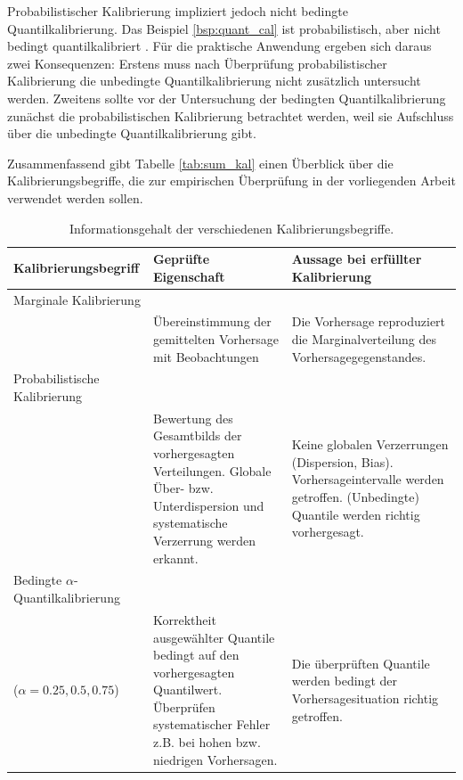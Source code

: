 Probabilistischer Kalibrierung impliziert jedoch nicht bedingte Quantilkalibrierung. Das Beispiel \ref{bsp:quant_cal} ist probabilistisch, aber nicht bedingt quantilkalibriert \parencite[Example 2.10]{gneiting2023regression}. Für die praktische Anwendung ergeben sich daraus zwei Konsequenzen: Erstens muss nach Überprüfung probabilistischer Kalibrierung die unbedingte Quantilkalibrierung nicht zusätzlich untersucht werden. Zweitens sollte vor der Untersuchung der bedingten Quantilkalibrierung zunächst die probabilistischen Kalibrierung betrachtet werden, weil sie Aufschluss über die unbedingte Quantilkalibrierung gibt.

Zusammenfassend gibt Tabelle \ref{tab:sum_kal} einen Überblick über die Kalibrierungsbegriffe, die zur empirischen Überprüfung in der vorliegenden Arbeit verwendet werden sollen.

\begin{table}[ht]
\caption{Informationsgehalt der verschiedenen Kalibrierungsbegriffe.}
\fontsize{10}{12}\selectfont
\label{tab:sum_kal}
\centering
\begin{tabularx}{\textwidth}{lXX}
\toprule
Kalibrierungsbegriff & Geprüfte Eigenschaft & Aussage bei erfüllter Kalibrierung \\
\midrule
Marginale Kalibrierung \\ &
Übereinstimmung der gemittelten Vorhersage mit Beobachtungen &
Die Vorhersage reproduziert die Marginalverteilung des Vorhersagegegenstandes.\\
\addlinespace
Probabilistische Kalibrierung \\ &
Bewertung des Gesamtbilds der vorhergesagten Verteilungen. Globale Über- bzw. Unterdispersion und systematische Verzerrung werden erkannt. &
Keine globalen Verzerrungen (Dispersion, Bias). Vorhersageintervalle werden getroffen. (Unbedingte) Quantile werden richtig vorhergesagt.\\
\addlinespace
Bedingte $\alpha$-Quantilkalibrierung\\ ($\alpha=0.25,0.5,0.75$) & Korrektheit ausgewählter Quantile bedingt auf den vorhergesagten Quantilwert. Überprüfen systematischer Fehler z.B. bei hohen bzw. niedrigen Vorhersagen. &
Die überprüften Quantile werden bedingt der Vorhersagesituation richtig getroffen. \\
\bottomrule
\end{tabularx}

\label{tab:calibration_summary}
\end{table}





